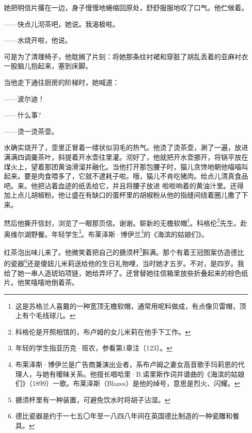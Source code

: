 \par 她把明信片撂在一边，身子慢慢地蜷缩回原处，舒舒服服地叹了口气。他伫候着。
\par ——快点儿沏茶吧，她说。我渴极啦。
\par ——水烧开啦，他说。
\par 可是为了清理椅子，他耽搁了片刻：将她那条纹衬裙和穿脏了胡乱丢着的亚麻衬衣一股脑儿抱起来，塞到床脚。
\par 当他走下通往厨房的阶梯时，她喊道：
\par ——波尔迪！
\par ——什么事?
\par ——烫一烫茶壶。
\par 水确实烧开了，壶里正冒着一缕状似羽毛的热气。他烫了烫茶壶，涮了一遍，放进满满四调羹茶叶，斜提着开水壶往里灌。沏好了，他就把开水壶挪开，将锅平放在煤火上，望着那团黄油滑溜并融化。当他打开那包腰子时，猫儿贪馋地朝他喵喵叫起来。要是肉食喂多了，它就不逮耗子啦。哦，猫儿不肯吃猪肉。给点儿清真食品吧。来。他把沾着血迹的纸丢给它，并且将腰子放进 啦啦响着的黄油汁里。还得加上点儿胡椒粉。他让盛在有缺口的蛋杯里的胡椒粉从他的指缝间绕着圈儿撒了下来。
\par 然后他撕开信封，浏览了一眼那页信。谢谢。崭新的无檐软帽\footnote{这是苏格兰人喜戴的一种宽顶无檐软帽，通常用呢料做成，有点像贝雷帽，顶上有个毛线球儿。}。科格伦\footnote{科格伦是开照相馆的，布卢姆的女儿米莉在他手下工作。}先生。赴奥维尔湖野餐。年轻学生\footnote{年轻的学生指亚历克·班农，参看第1章注〔123〕。}。布莱泽斯·博伊兰\footnote{布莱泽斯·博伊兰是广告商兼演出业者，系布卢姆之妻女高音歌手玛莉恩的代理人，与她有暧昧关系。他擅长唱哈里·B.诺里斯作词并谱曲的《海滨的姑娘们》（1899）一歌。布莱泽斯（Blazes）是他的绰号，意思是烈火、闪耀。}的《海滨的姑娘们》。
\par 红茶泡出味儿来了。他微笑着把自己的搪须杯\footnote{搪须杯里有一种装置，可避免饮水时将胡子沾湿。}斟满。那个有着王冠图案仿造德比的瓷器\footnote{德比瓷器是约于一七五〇年至一八四八年间在英国德比制造的一种瓷雕和餐具。}还是傻妞儿米莉送给他的生日礼物哩，当时她才五岁。不对，是四岁。我给了她一串人造琥珀项链，她给弄坏了。还曾替她往信箱里放些折叠起来的棕色纸片。他笑嘻嘻地倒着茶。

